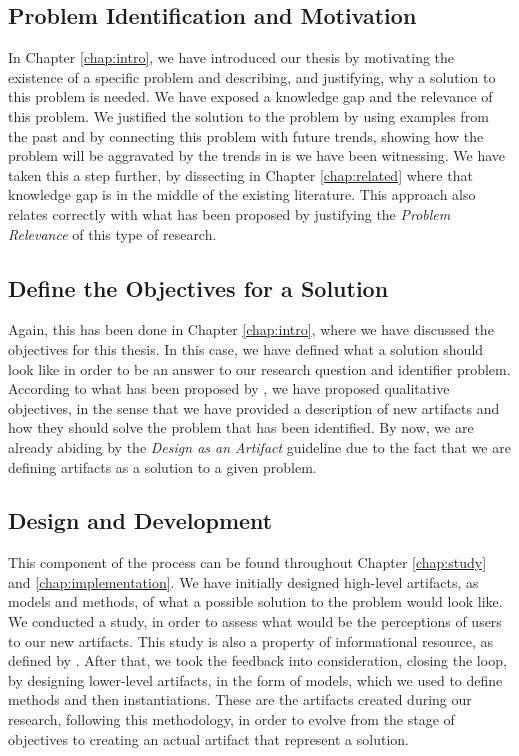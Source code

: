 \subsection{Problem Identification and Motivation}

In Chapter \ref{chap:intro}, we have introduced our thesis by motivating the existence of a specific problem and describing, and justifying, why a solution to this problem is needed. We have exposed a knowledge gap and the relevance of this problem. We justified the solution to the problem by using examples from the past and by connecting this problem with future trends, showing how the problem will be aggravated by the trends in \gls{is} we have been witnessing. We have taken this a step further, by dissecting in Chapter \ref{chap:related} where that knowledge gap is in the middle of the existing literature. This approach also relates correctly with what has been proposed \citeauthor{hevner_design_2004} by justifying the \textit{Problem Relevance} of this type of research.

\subsection{Define the Objectives for a Solution}

Again, this has been done in Chapter \ref{chap:intro}, where we have discussed the objectives for this thesis. In this case, we have defined what a solution should look like in order to be an answer to our research question and identifier problem. According to what has been proposed by \citeauthor{peffers_design_2007}, we have proposed qualitative objectives, in the sense that we have provided a description of new artifacts and how they should solve the problem that has been identified. By now, we are already abiding by the \textit{Design as an Artifact} guideline \cite{hevner_design_2004} due to the fact that we are defining artifacts as a solution to a given problem.

\subsection{Design and Development}

This component of the process can be found throughout Chapter \ref{chap:study} and \ref{chap:implementation}. We have initially designed high-level artifacts, as models and methods, of what a possible solution to the problem would look like. We conducted a study, in order to assess what would be the perceptions of users to our new artifacts. This study is also a property of informational resource, as defined by \citeauthor{peffers_design_2007}. After that, we took the feedback into consideration, closing the loop, by designing lower-level artifacts, in the form of models, which we used to define methods and then instantiations. These are the artifacts created during our research, following this methodology, in order to evolve from the stage of objectives to creating an actual artifact that represent a solution.

